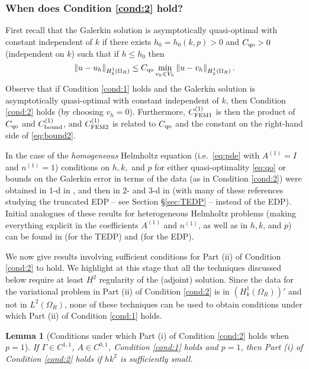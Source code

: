 \documentclass[10pt]{article}%
\newtheorem{lemma}[theorem]{Lemma}
\numberwithin{equation}{section}
\newcommand{\beq}{\begin{equation}}
\newcommand{\eeq}{\end{equation}}
\newcommand{\ble}{\begin{lemma}}
\newcommand{\ele}{\end{lemma}}
\newcommand{\OR}{{\Omega_R}}
\newcommand{\HoDkk}{{H^1_{k}(\domain_R)}}
\newcommand*{\N}[1]{\left\|#1\right\|}
\newcommand{\domain}{\Omega}
\newcommand{\coeffAo}{A^{(1)}}
\newcommand{\coeffno}{n^{(1)}}
\begin{document}
\subsubsection{When does Condition \ref{cond:2} hold?}\label{sec:cond2hold}

First recall that the Galerkin solution is asymptotically quasi-optimal with constant independent of $k$ if there exists $h_0= h_0(k,p)>0$ and $C_{\rm qo}>0$ (independent on $k$) such that if $h\leq h_0$ then 
\beq\label{eq:qo}
\N{u-u_h}_{\HoDkk} \leq C_{\rm qo} \min_{v_h\in V_h} \N{u-v_h}_{\HoDkk}.
\eeq
Observe that if Condition \ref{cond:1} holds and the Galerkin solution is asymptotically quasi-optimal with constant independent of $k$, 
then Condition \ref{cond:2} holds (by choosing $v_h=0$). Furthermore, $C^{(1)}_{\rm FEM1}$ is then the product of $C_{\rm qo}$ and $C^{(1)}_{\rm bound}$, and  $C^{(1)}_{\rm FEM2}$ is related to $C_{\rm qo}$ and the constant on the right-hand side of \eqref{eq:bound2}.

In the case of the \emph{homogeneous} Helmholtz equation (i.e.~\eqref{eq:pde} with $\coeffAo= I$ and $\coeffno=1$) conditions on $h,k,$ and $p$ for either quasi-optimality \eqref{eq:qo} or bounds on the Galerkin error in terms of the data (as in Condition \ref{cond:2}) were obtained in 1-d in \cite{IhBa:95, IhBa:97}, and then in 2- and 3-d in \cite{Me:95, Sa:06, MeSa:10, MeSa:11, Wu:13, ZhWu:13, ChNi:18} (with many of these references studying the truncated EDP -- see Section \S\ref{sec:TEDP} -- instead of the EDP). 
Initial analogues of these results for heterogeneous Helmholtz problems (making everything explicit in the coefficients $\coeffAo$ and $\coeffno$, as well as in $h, k$, and $p$) can be found in \cite{GrSa:18} (for the TEDP) and \cite{GaSpWu:18} (for the EDP).
 
We now give results involving sufficient conditions for Part (ii) of Condition \ref{cond:2}  to hold. 
We highlight at this stage that all the techniques discussed below
require at least $H^2$ regularity of the (adjoint) solution. Since the data for the variational problem in Part (ii) of Condition \ref{cond:2} is in $(\HoDkk)'$ and not in $L^2(\OR)$, none of these techniques can be used to obtain conditions under which Part (ii) of Condition \ref{cond:1} holds.

\ble[Conditions under which Part (i) of Condition \ref{cond:2} holds when $p=1$]\label{lem:hp1}
If $\Gamma\in C^{1,1}$, $A\in C^{0,1}$, Condition \ref{cond:1} holds and $p=1$, then Part (i) of Condition \ref{cond:2} holds
if $h k^2$ is sufficiently small. 
\ele
\end{document}
